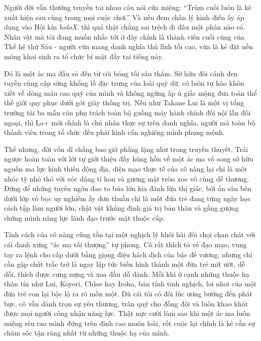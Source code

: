 \documentclass[../main.tex]{subfiles}
\begin{document}

Người đời vẫn thường truyền tai nhau câu nói cửa miệng: ``Trùm cuối luôn là kẻ xuất hiện sau cùng trong mọi cuộc chơi.'' Và nếu đem chân lý kinh điển ấy áp dụng vào Hội kín \textit{holoX}, thì quả thật chẳng sai trệch đi đâu một phân nào cả. Nhân vật mà tôi đang muốn nhắc tới ở đây chính là thành viên cuối cùng của Thế hệ thứ Sáu - người vừa mang danh nghĩa thủ lĩnh tối cao, vừa là kẻ đặt nền móng khai sinh ra tổ chức bí mật đầy tai tiếng này.

Đó là một ác ma đầu sỏ đến từ cõi bóng tối sâu thẳm. Sở hữu đôi cánh đen tuyền cùng cặp sừng khổng lồ đặc trưng của loài quỷ dữ, cô luôn tự hào khôn xiết về dòng máu cao quý của mình và không ngừng ấp ủ giấc mộng đưa toàn thể thế giới quy phục dưới gót giày thống trị. Nếu như Takane Lui là một vị tổng trưởng tài ba mẫn cán phụ trách toàn bộ guồng máy hành chính đối nội lẫn đối ngoại, thì La+ mới chính là chủ nhân thực sự trên danh nghĩa, người mà toàn bộ thành viên trong tổ chức đều phải kính cẩn nghiêng mình phụng mệnh.

Thế nhưng, đời vốn dĩ chẳng bao giờ phẳng lặng như trong truyền thuyết. Trái ngược hoàn toàn với lời tự giới thiệu đầy hùng hồn về một ác ma vô song sở hữu nguồn ma lực kinh thiên động địa, diện mạo thực tế của cô nàng lại chỉ là một nhóc tỳ nhỏ thó với vóc dáng tí hon và gương mặt tròn xoe vô cùng dễ thương. Đừng để những tuyên ngôn đao to búa lớn kia đánh lừa thị giác, bởi ẩn sâu bên dưới lớp vỏ bọc uy nghiêm ấy đơn thuần chỉ là một đứa trẻ đang từng ngày học cách tập làm người lớn, chật vật khẳng định giá trị bản thân và gắng gượng chứng minh năng lực lãnh đạo trước mặt thuộc cấp.

Tính cách của cô nàng cũng tồn tại một nghịch lý khôi hài đối chọi chan chát với cái danh xưng ``ác ma tối thượng'' tự phong. Cô rất thích tỏ vẻ đạo mạo, vung tay ra lệnh cho cấp dưới bằng giọng điệu hách dịch của bậc đế vương; nhưng chỉ cần gặp chút trắc trở là ngay lập tức biến hình thành một đứa trẻ mít ướt, dễ dỗi, thích được cưng nựng và xoa đầu dỗ dành. Mỗi khi ở cạnh những thuộc hạ thân tín như Lui, Koyori, Chloe hay Iroha, bản tính tinh nghịch, loi nhoi của một đứa trẻ con lại bộc lộ ra rõ mồn một. Dù cái tôi có đôi lúc ương bướng đến phát bực, cô vẫn dành trọn sự yêu thương, trân quý cho đồng đội và luôn khao khát được mọi người công nhận năng lực. Thật nực cười làm sao khi một ác ma luôn miệng rêu rao mình đứng trên đỉnh cao muôn loài, rốt cuộc lại chính là kẻ cần sự chăm sóc tận răng nhất từ những thuộc hạ của mình.
\end{document}
